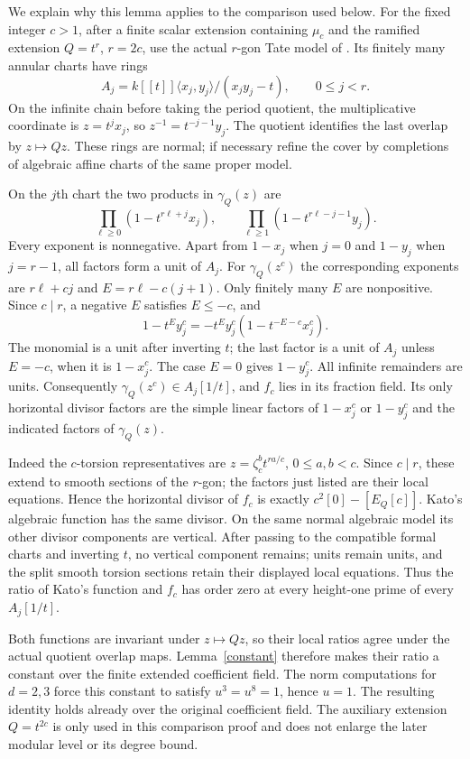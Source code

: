 \documentclass[11pt]{article}
\theoremstyle{remark}\newtheorem{remark}[theorem]{Remark}
\begin{document}
We explain why this lemma applies to the comparison used below.
For the fixed integer $c>1$, after a finite scalar extension containing
$\mu_c$ and the ramified extension $Q=t^r$, $r=2c$, use the actual
$r$-gon Tate model of \cite[Section 2.5]{conrad}. Its finitely many
annular charts have rings
\[
 A_j=k[[t]]\langle x_j,y_j\rangle/(x_jy_j-t),\qquad 0\leq j<r.
\]
On the infinite chain before taking the period quotient, the
multiplicative coordinate is $z=t^jx_j$, so
$z^{-1}=t^{-j-1}y_j$. The quotient identifies the last overlap by
$z\mapsto Qz$. These rings are normal; if necessary refine the cover
by completions of algebraic affine charts of the same proper model.

On the $j$th chart the two products in $\gamma_Q(z)$ are
\[
 \prod_{\ell\geq0}(1-t^{r\ell+j}x_j),\qquad
 \prod_{\ell\geq1}(1-t^{r\ell-j-1}y_j).
\]
Every exponent is nonnegative. Apart from $1-x_j$ when $j=0$ and
$1-y_j$ when $j=r-1$, all factors form a unit of $A_j$.
For $\gamma_Q(z^c)$ the corresponding exponents are
$r\ell+cj$ and $E=r\ell-c(j+1)$. Only finitely many $E$ are nonpositive.
Since $c\mid r$, a negative $E$ satisfies $E\leq-c$, and
\[
 1-t^Ey_j^c=-t^Ey_j^c(1-t^{-E-c}x_j^c).
\]
The monomial is a unit after inverting $t$; the last factor is a unit
of $A_j$ unless $E=-c$, when it is $1-x_j^c$.
The case $E=0$ gives $1-y_j^c$. All infinite remainders are units.
Consequently $\gamma_Q(z^c)\in A_j[1/t]$, and $f_c$ lies in its
fraction field. Its only horizontal divisor factors are the simple
linear factors of $1-x_j^c$ or $1-y_j^c$ and the indicated factors
of $\gamma_Q(z)$.

Indeed the $c$-torsion representatives are
$z=\zeta_c^b t^{ra/c}$, $0\leq a,b<c$. Since $c\mid r$, these extend
to smooth sections of the $r$-gon; the factors just listed are their
local equations. Hence the horizontal divisor of $f_c$ is exactly
$c^2[0]-[E_Q[c]]$. Kato's algebraic function has the same divisor.
On the same normal algebraic model its other divisor components are
vertical. After passing to the compatible formal charts and inverting
$t$, no vertical component remains; units remain units, and the split
smooth torsion sections retain their displayed local equations.
Thus the ratio of Kato's function and $f_c$ has order zero at every
height-one prime of every $A_j[1/t]$.

Both functions are invariant under $z\mapsto Qz$, so their local
ratios agree under the actual quotient overlap maps. Lemma~\ref{constant}
therefore makes their ratio a constant over the finite extended
coefficient field. The norm computations for $d=2,3$ force this
constant to satisfy $u^3=u^8=1$, hence $u=1$. The resulting identity
holds already over the original coefficient field. The auxiliary
extension $Q=t^{2c}$ is only used in this comparison proof and does
not enlarge the later modular level or its degree bound.
\end{document}
